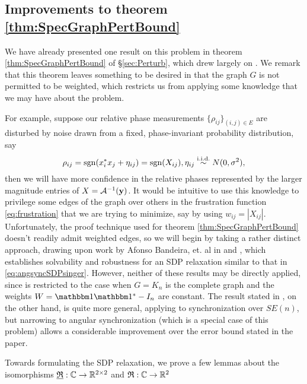 \subsection{Improvements to theorem \ref{thm:SpecGraphPertBound}}

We have already presented one result on this problem in theorem \ref{thm:SpecGraphPertBound} of \S\ref{sec:Perturb}, which drew largely on \cite{alexeev2014phase}.  %
We remark that this theorem leaves something to be desired in that the graph $G$ is not permitted to be weighted, which restricts us from applying some knowledge that we may have about the problem.  

For example, suppose our relative phase measurements $\{\rho_{ij}\}_{(i,j) \in E}$ are disturbed by noise drawn from a fixed, phase-invariant probability distribution, say \[\rho_{ij} = \operatorname{sgn}(x_i^*x_j + \eta_{ij}) = \operatorname{sgn}(X_{ij}), \eta_{ij} \overset{\text{i.i.d.}}{\sim} N(0, \sigma^2),\] then we will have more confidence in the relative phases represented by the larger magnitude entries of $X = \mathcal{A}^{-1}(\mathbf{y})$.  It would be intuitive to use this knowledge to privilege some edges of the graph over others in the frustration function \eqref{eq:frustration} that we are trying to minimize, say by using $w_{ij} = |X_{ij}|$.  Unfortunately, the proof technique used for theorem \ref{thm:SpecGraphPertBound} doesn't readily admit weighted edges, so we will begin by taking a rather distinct approach, drawing upon work by Afonso Bandeira, et. al in \cite{bandeira2016se_sync} and \cite{bandeira2016tightness}, which establishes solvability and robustness for an SDP relaxation similar to that in \eqref{eq:angsyncSDPsinger}.  However, neither of these results may be directly applied, since \cite{bandeira2016tightness} is restricted to the case when $G = K_n$ is the complete graph and the weights $W = \one \one^* - I_n$ are constant.  The result stated in \cite{bandeira2016se_sync}, on the other hand, is quite more general, applying to synchronization over $SE(n)$, but narrowing to angular synchronization (which is a special case of this problem) allows a considerable improvement over the error bound stated in the paper.  

Towards formulating the SDP relaxation, we prove a few lemmas about the isomorphisms $\underline{\mathfrak{R}} : \mathbb{C} \to \mathbb{R}^{2 \times 2}$ and $\mathfrak{R} : \mathbb{C} \to \mathbb{R}^2$
